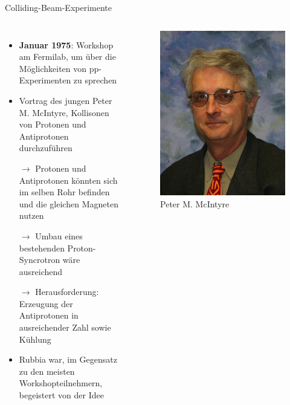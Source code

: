 \documentclass[aspectratio=1610, professionalfonts, 10pt]{beamer}
\begin{document}
\begin{frame}{Colliding-Beam-Experimente}
	\begin{columns}
				\begin{itemize}
					\setlength\itemsep{0.5em}
					\item \textbf{Januar 1975}: Workshop am Fermilab, um über die Möglichkeiten von pp-Experimenten zu sprechen
					\item Vortrag des jungen Peter M. McIntyre, Kollisonen von Protonen und Antiprotonen durchzuführen
					\item[$\rightarrow$] Protonen und Antiprotonen könnten sich im selben Rohr befinden und die gleichen Magneten nutzen
					\item[$\rightarrow$] Umbau eines bestehenden Proton-Syncrotron wäre ausreichend
					\item[$\rightarrow$] Herausforderung: Erzeugung der Antiprotonen in ausreichender Zahl sowie Kühlung
					\item Rubbia war, im Gegensatz zu den meisten Workshopteilnehmern, begeistert von der Idee
				\end{itemize}
			\begin{figure}
	  			\centering
				\includegraphics[width=0.8\linewidth]{Images/mcintyre.jpg}
				\caption{Peter M. McIntyre \cite{mci}}
	  			\label{fig:sad}
			\end{figure}

	\end{columns}
\end{frame}
\end{document}
